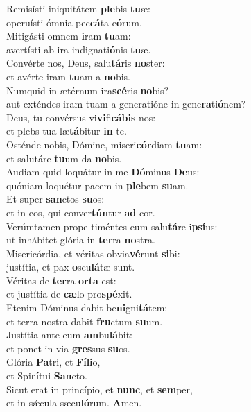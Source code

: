 \evenverse Remisísti iniquitátem \textbf{ple}bis \textbf{tu}æ:~\*\\
\evenverse operuísti ómnia pec\textbf{cá}ta e\textbf{ó}rum.\\
\oddverse Mitigásti omnem \textbf{i}ram \textbf{tu}am:~\*\\
\oddverse avertísti ab ira indignati\textbf{ó}nis \textbf{tu}æ.\\
\evenverse Convérte nos, Deus, salu\textbf{tá}ris \textbf{no}ster:~\*\\
\evenverse et avérte iram \textbf{tu}am a \textbf{no}bis.\\
\oddverse Numquid in ætérnum ira\textbf{scé}ris \textbf{no}bis?~\*\\
\oddverse aut exténdes iram tuam a generatióne in gene\textbf{ra}ti\textbf{ó}nem?\\
\evenverse Deus, tu convérsus vi\textbf{vi}fi\textbf{cá}\textbf{bis} nos:~\*\\
\evenverse et plebs tua læ\textbf{tá}bitur \textbf{in} te.\\
\oddverse Osténde nobis, Dómine, miseri\textbf{cór}diam \textbf{tu}am:~\*\\
\oddverse et salutáre \textbf{tu}um da \textbf{no}bis.\\
\evenverse Audiam quid loquátur in me \textbf{Dó}minus \textbf{De}us:~\*\\
\evenverse quóniam loquétur pacem in \textbf{ple}bem \textbf{su}am.\\
\oddverse Et super \textbf{san}ctos \textbf{su}os:~\*\\
\oddverse et in eos, qui conver\textbf{tún}tur \textbf{ad} cor.\\
\evenverse Verúmtamen prope timéntes eum salu\textbf{tá}re i\textbf{psí}us:~\*\\
\evenverse ut inhábitet glória in \textbf{ter}ra \textbf{no}stra.\\
\oddverse Misericórdia, et véritas obvia\textbf{vé}runt \textbf{si}bi:~\*\\
\oddverse justítia, et pax \textbf{o}scu\textbf{lá}tæ sunt.\\
\evenverse Véritas de \textbf{ter}ra \textbf{or}\textbf{ta} est:~\*\\
\evenverse et justítia de \textbf{cæ}lo pro\textbf{spé}xit.\\
\oddverse Etenim Dóminus dabit be\textbf{ni}gni\textbf{tá}tem:~\*\\
\oddverse et terra nostra dabit \textbf{fru}ctum \textbf{su}um.\\
\evenverse Justítia ante eum \textbf{am}bu\textbf{lá}bit:~\*\\
\evenverse et ponet in via \textbf{gres}sus \textbf{su}os.\\
\oddverse Glória \textbf{Pa}tri, et \textbf{Fí}\textbf{li}o,~\*\\
\oddverse et Spi\textbf{rí}tui \textbf{San}cto.\\
\evenverse Sicut erat in princípio, et \textbf{nunc}, et \textbf{sem}per,~\*\\
\evenverse et in sǽcula sæcu\textbf{ló}rum. \textbf{A}men.\\
